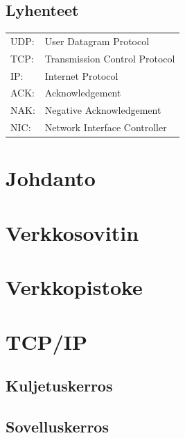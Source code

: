 \documentclass[a4paper,12pt]{article}
\begin{document}
\begin{titlepage}
        \tableofcontents
        \newpage
        \thispagestyle{empty}

        {
            \section*{Lyhenteet}
            \begin{tabular}{l l}
                UDP: & User Datagram Protocol        \\
                TCP: & Transmission Control Protocol \\
                IP:  & Internet Protocol             \\
                ACK: & Acknowledgement               \\
                NAK: & Negative Acknowledgement      \\
                NIC: & Network Interface Controller  \\
            \end{tabular}
            \newpage
        }

    \end{titlepage}

    {
        \section{Johdanto}\label{sec:johdanto}
        \blindtext
    }

    {
        \section{Verkkosovitin}\label{sec:verkkosovitin}
        \blindtext
    }


    \section{Verkkopistoke}\label{sec:verkkopistoke}
    \blindtext

    {
            {
            \section{TCP/IP}\label{sec:tcpip}
            \blindtext
        }
            {
            \subsection{Kuljetuskerros}\label{subsec:kuljetuskerros}
            \blindtext
        }
            {
            \subsection{Sovelluskerros}\label{subsec:sovelluskerros}
            \blindtext
        }
    }
\end{document}
